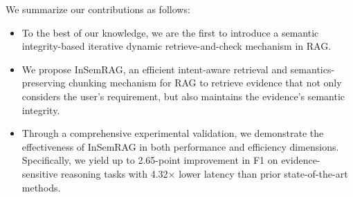 We summarize our contributions as follows:
\begin{itemize}
    \item To the best of our knowledge, we are the first to introduce a semantic integrity-based iterative dynamic retrieve-and-check mechanism in RAG.
    
    \item We propose InSemRAG, an efficient intent-aware retrieval and semantics-preserving chunking mechanism for RAG to retrieve evidence that not only considers the user's requirement, but also maintains the evidence's semantic integrity.
    
    \item Through a comprehensive experimental validation, we demonstrate the effectiveness of InSemRAG in both performance and efficiency dimensions. Specifically, we yield up to 2.65-point improvement in F1 on evidence-sensitive reasoning tasks with 4.32× lower latency than prior state-of-the-art methods.
    
\end{itemize}

